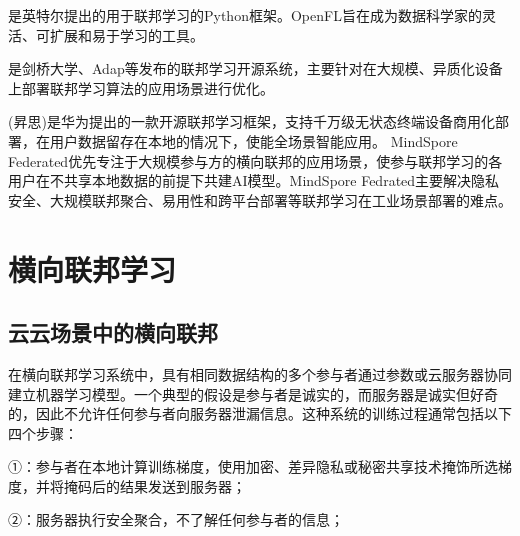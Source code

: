 \documentclass[letterpaper,10pt,english]{sphinxmanual}
\begin{document}
\sphinxAtStartPar
{}%
\begin{footnote}[77]\sphinxAtStartFootnote
{}
%
\end{footnote}是英特尔提出的用于联邦学习的Python框架。OpenFL旨在成为数据科学家的灵活、可扩展和易于学习的工具。

\sphinxAtStartPar
{}%
\begin{footnote}[78]\sphinxAtStartFootnote
{}
%
\end{footnote}是剑桥大学、Adap等发布的联邦学习开源系统，主要针对在大规模、异质化设备上部署联邦学习算法的应用场景进行优化。

\sphinxAtStartPar
{}%
\begin{footnote}[79]\sphinxAtStartFootnote
{}
%
\end{footnote}
(昇思)是华为提出的一款开源联邦学习框架，支持千万级无状态终端设备商用化部署，在用户数据留存在本地的情况下，使能全场景智能应用。
MindSpore
Federated优先专注于大规模参与方的横向联邦的应用场景，使参与联邦学习的各用户在不共享本地数据的前提下共建AI模型。MindSpore
Fedrated主要解决隐私安全、大规模联邦聚合、易用性和跨平台部署等联邦学习在工业场景部署的难点。


\section{横向联邦学习}
\label{\detokenize{chapter_federated_learning/horizontal_fl:id1}}\label{\detokenize{chapter_federated_learning/horizontal_fl::doc}}

\subsection{云云场景中的横向联邦}
\label{\detokenize{chapter_federated_learning/horizontal_fl:id2}}
\sphinxAtStartPar
在横向联邦学习系统中，具有相同数据结构的多个参与者通过参数或云服务器协同建立机器学习模型。一个典型的假设是参与者是诚实的，而服务器是诚实但好奇的，因此不允许任何参与者向服务器泄漏信息。这种系统的训练过程通常包括以下四个步骤：

\sphinxAtStartPar
①：参与者在本地计算训练梯度，使用加密、差异隐私或秘密共享技术掩饰所选梯度，并将掩码后的结果发送到服务器；

\sphinxAtStartPar
②：服务器执行安全聚合，不了解任何参与者的信息；
\end{document}
